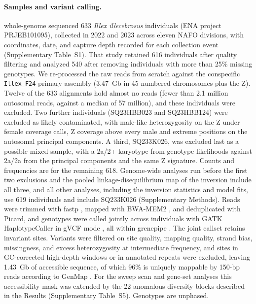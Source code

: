 \documentclass[11pt]{article}
\newcommand{\illex}{\textit{Illex illecebrosus}}
\begin{document}
\paragraph{Samples and variant calling.}
\citet{baker2025} whole-genome sequenced 633 \illex{} individuals (ENA project PRJEB101095),
collected in 2022 and 2023 across eleven NAFO divisions, with coordinates, date, and capture depth recorded for
each collection event (Supplementary Table~S1). That study retained 616 individuals after quality filtering and analyzed 540 after removing individuals with
more than 25\% missing genotypes. We re-processed the raw reads from scratch against the conspecific \texttt{Illex\_F24} primary
assembly \citep{small2026} (3.47~Gb in 45 numbered chromosomes plus the Z). Twelve of the 633 alignments hold almost no
reads (fewer than 2.1 million autosomal reads, against a median of 57 million), and these individuals were excluded.
Two further individuals (SQ23HBB023 and SQ23HBB124) were excluded as likely contaminated, with male-like heterozygosity on the Z under female coverage calls, Z coverage above every male and extreme positions on the autosomal principal components. A third, SQ233K026, was excluded last as a possible mixed sample, with a 2a/2+ karyotype from genotype likelihoods against 2a/2a from the principal components and the same Z signature. Counts and frequencies are for the remaining 618. Genome-wide analyses run before the first two exclusions and the pooled linkage-disequilibrium map of the inversion include all three, and all other analyses, including the inversion statistics and model fits, use 619 individuals and include SQ233K026 (Supplementary Methods).
Reads were trimmed with fastp \citep{chen2018fastp}, mapped with BWA-MEM2 \citep{vasimuddin2019bwamem2}, and
deduplicated with Picard, and genotypes were called jointly across individuals with GATK HaplotypeCaller in gVCF
mode \citep{poplin2018gatk}, all within grenepipe \citep{czech2022grenepipe}. The joint callset retains invariant
sites. Variants were filtered on site quality, mapping quality, strand bias, missingness, and excess
heterozygosity at intermediate frequency, and sites in GC-corrected high-depth windows or in annotated repeats were excluded, leaving 1.43~Gb of accessible sequence, of which 96\% is uniquely mappable by 150-bp reads according to GenMap \citep{pockrandt2020genmap}. For the sweep scan and gene-set analyses this accessibility mask was extended by the 22 anomalous-diversity blocks described in the Results (Supplementary Table~S5). Genotypes are unphased.
\end{document}
